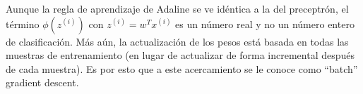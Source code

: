 Aunque la regla de aprendizaje de Adaline se ve idéntica a la del preceptrón,
el término $\phi(z^{(i)})$ con $z^{(i)}=w^Tx^{(i)}$ es un número real y no un
número entero de clasificación. Más aún, la actualización de los pesos está
basada en todas las muestras de entrenamiento (en lugar de actualizar de
forma incremental después de cada muestra). Es por esto que a este acercamiento
se le conoce como ``batch'' gradient descent.

